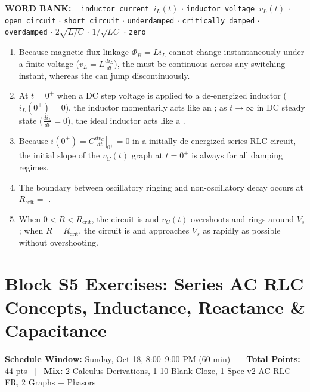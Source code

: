 \documentclass[10pt,letterpaper]{article}
\begin{document}
{{{  \textbf{WORD BANK:} ~
  \texttt{inductor current $i_L(t)$} $\cdot$
  \texttt{inductor voltage $v_L(t)$} $\cdot$
  \texttt{open circuit} $\cdot$
  \texttt{short circuit} $\cdot$
  \texttt{underdamped} $\cdot$
  \texttt{critically damped} $\cdot$
  \texttt{overdamped} $\cdot$
  \texttt{$2\sqrt{L/C}$} $\cdot$
  \texttt{$1/\sqrt{LC}$} $\cdot$
  \texttt{zero}


\begin{enumerate}
  \item Because magnetic flux linkage $\Phi_B = L i_L$ cannot change instantaneously under a finite voltage ($v_L = L\frac{di_L}{dt}$), the \underline{\hspace{1.8in}} must be continuous across any switching instant, whereas the \underline{\hspace{1.8in}} can jump discontinuously.
  \item At $t = 0^+$ when a DC step voltage is applied to a de-energized inductor ($i_L(0^+)=0$), the inductor momentarily acts like an \underline{\hspace{1.8in}}; as $t \to \infty$ in DC steady state ($\frac{di_L}{dt} = 0$), the ideal inductor acts like a \underline{\hspace{1.8in}}.
  \item Because $i(0^+) = C\left.\frac{dv_C}{dt}\right|_{0^+} = 0$ in a initially de-energized series RLC circuit, the initial slope of the $v_C(t)$ graph at $t = 0^+$ is always \underline{\hspace{1.8in}} for all damping regimes.
  \item The boundary between oscillatory ringing and non-oscillatory decay occurs at $R_{\text{crit}} =$ \underline{\hspace{1.8in}}.
  \item When $0 < R < R_{\text{crit}}$, the circuit is \underline{\hspace{1.8in}} and $v_C(t)$ overshoots and rings around $V_s$; when $R = R_{\text{crit}}$, the circuit is \underline{\hspace{1.8in}} and approaches $V_s$ as rapidly as possible without overshooting.
\end{enumerate}
\newpage
\section*{Block S5 Exercises: Series AC RLC Concepts, Inductance, Reactance \& Capacitance}

  \textbf{Schedule Window:} Sunday, Oct 18, 8:00--9:00 PM (60 min) ~|~
  \textbf{Total Points:} 44 pts ~|~
  \textbf{Mix:} 2 Calculus Derivations, 1 10-Blank Cloze, 1 Spec v2 AC RLC FR, 2 Graphs + Phasors



}}}
\end{document}
